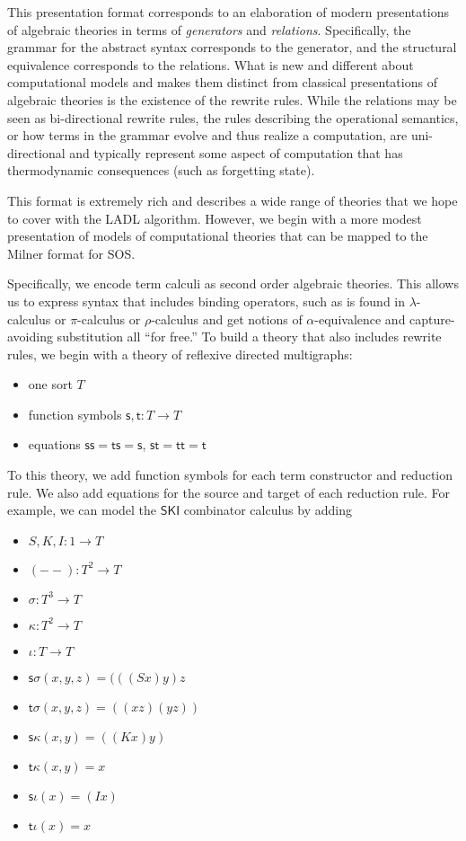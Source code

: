 \documentclass{llncs}
\renewcommand{\:}{\colon}
\newcommand{\pic}{$\pi$-calculus}
\newcommand{\rhoc}{$\rho$-calculus}
\newcommand{\lamc}{$\lambda$-calculus}
\begin{document}
This presentation format corresponds to an elaboration of modern
presentations of algebraic theories in terms of \emph{generators} and
\emph{relations}. Specifically, the grammar for the abstract syntax
corresponds to the generator, and the structural equivalence
corresponds to the relations. What is new and different about
computational models and makes them distinct from classical
presentations of algebraic theories is the existence of the rewrite
rules. While the relations may be seen as bi-directional rewrite
rules, the rules describing the operational semantics, or how terms in
the grammar evolve and thus realize a computation, are uni-directional
and typically represent some aspect of computation that has
thermodynamic consequences (such as forgetting state).

This format is extremely rich and describes a wide range of theories
that we hope to cover with the LADL algorithm. However, we begin with
a more modest presentation of models of computational theories that
can be mapped to the Milner format for SOS. 

Specifically, we encode term calculi as second order algebraic
theories. This allows us to express syntax that includes binding
operators, such as is found in {\lamc} or {\pic} or {\rhoc} and get
notions of $\alpha$-equivalence and capture-avoiding substitution all
``for free.'' To build a theory that also includes rewrite rules, we
begin with a theory of reflexive directed multigraphs:

\begin{itemize}
  \item one sort $T$
  \item function symbols $\mathsf{s}, \mathsf{t}: T \rightarrow T$
  \item equations $\mathsf{ss} = \mathsf{ts} = \mathsf{s}$, $\mathsf{st} = \mathsf{tt} = \mathsf{t}$
\end{itemize}

To this theory, we add function symbols for each term constructor and
reduction rule.  We also add equations for the source and target of
each reduction rule.  For example, we can model the $\mathsf{SKI}$ combinator
calculus by adding

\begin{itemize}
  \item $S, K, I : 1 \rightarrow T$
  \item $(- -) : T^{2} \rightarrow T$
  \item $\sigma : T^{3} \rightarrow T$
  \item $\kappa : T^{2} \rightarrow T$
  \item $\iota : T \rightarrow T$
  \item $\mathsf{s}\sigma(x, y, z) = (((S x) y) z$
  \item $\mathsf{t}\sigma(x, y, z) = ((x z) (y z))$
  \item $\mathsf{s}\kappa(x, y) = ((K x) y)$
  \item $\mathsf{t}\kappa(x, y) = x$
  \item $\mathsf{s}\iota(x) = (I x)$
  \item $\mathsf{t}\iota(x) = x$
\end{itemize}
\end{document}
